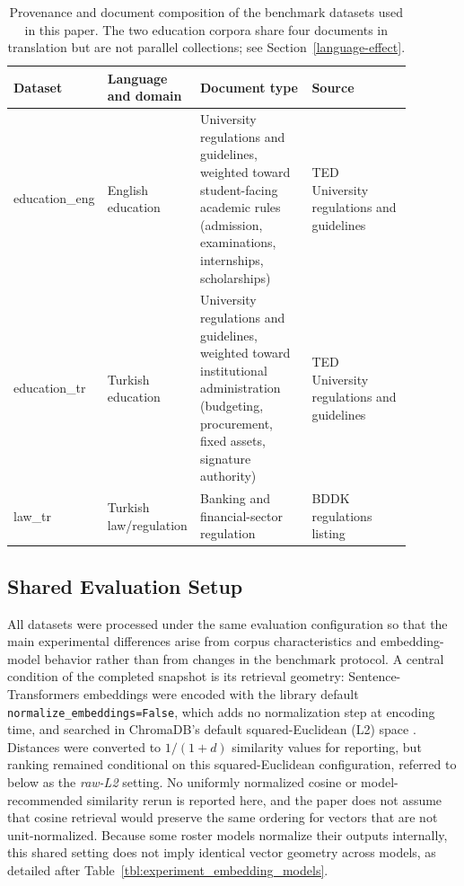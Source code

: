\begin{table}[htbp]
\caption{Provenance and document composition of the benchmark datasets used in this paper. The two education corpora share four documents in translation but are not parallel collections; see Section~\ref{language-effect}.}\label{tbl:dataset_provenance}
\centering
\begin{tabular}{@{}>{\raggedright\arraybackslash}p{0.16\linewidth}>{\raggedright\arraybackslash}p{0.18\linewidth}>{\raggedright\arraybackslash}p{0.29\linewidth}>{\raggedright\arraybackslash}p{0.25\linewidth}@{}}
\toprule
Dataset & Language and domain & Document type & Source \\
\midrule
education\_eng & English education & University regulations and guidelines, weighted toward student-facing academic rules (admission, examinations, internships, scholarships) & TED University regulations and guidelines \\
education\_tr & Turkish education & University regulations and guidelines, weighted toward institutional administration (budgeting, procurement, fixed assets, signature authority) & TED University regulations and guidelines \\
law\_tr & Turkish law/regulation & Banking and financial-sector regulation & BDDK regulations listing \\
\bottomrule
\end{tabular}
\end{table}

\subsection{Shared Evaluation Setup}\label{shared-evaluation-setup}

All datasets were processed under the same evaluation configuration so that the main experimental differences arise from corpus characteristics and embedding-model behavior rather than from changes in the benchmark protocol. A central condition of the completed snapshot is its retrieval geometry: Sentence-Transformers embeddings were encoded with the library default \texttt{normalize\_embeddings=False}, which adds no normalization step at encoding time, and searched in ChromaDB's default squared-Euclidean (L2) space \citep{ChromaDB_Docs}. Distances were converted to $1/(1+d)$ similarity values for reporting, but ranking remained conditional on this squared-Euclidean configuration, referred to below as the \emph{raw-L2} setting. No uniformly normalized cosine or model-recommended similarity rerun is reported here, and the paper does not assume that cosine retrieval would preserve the same ordering for vectors that are not unit-normalized. Because some roster models normalize their outputs internally, this shared setting does not imply identical vector geometry across models, as detailed after Table~\ref{tbl:experiment_embedding_models}.

